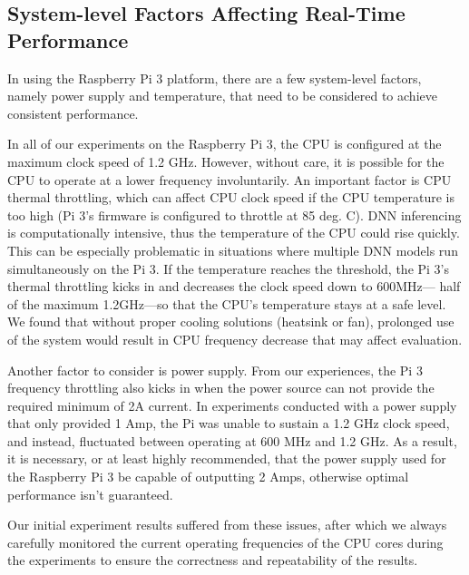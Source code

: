 
\subsection{System-level Factors Affecting Real-Time Performance}
In using the Raspberry Pi 3 platform, there are a
few system-level factors, namely power supply and temperature, that
need to be considered to achieve consistent performance. 

In all of our experiments on the Raspberry Pi 3, the CPU  is configured
at the maximum clock speed of 1.2 GHz. However, without care, it is
possible for the CPU to operate at a lower frequency involuntarily. 
An important factor is CPU thermal throttling, which can affect CPU
clock speed if the CPU temperature is too high (Pi 3's firmware is
configured to throttle at 85 deg. C).
DNN inferencing is computationally intensive, thus the temperature of
the CPU could rise quickly. This can be especially problematic in
situations where multiple DNN models run simultaneously on the
Pi 3. If the temperature reaches the threshold, the Pi 3's thermal
throttling kicks in and decreases the clock speed down to 600MHz---
half of the maximum 1.2GHz---so that the CPU's temperature stays at a
safe level.
We found that without proper cooling solutions (heatsink or fan), 
prolonged use of the system would result in CPU frequency decrease
that may affect evaluation.

Another factor to consider is power supply. From our experiences, the
Pi 3 frequency throttling also kicks in when the power source can not
provide the required minimum of 2A current.
In experiments conducted with a power supply that only provided 1 Amp,
the Pi was unable to sustain a 1.2 GHz clock speed, and instead,
fluctuated between operating at 600 MHz and 1.2 GHz. As a result, it
is necessary, or at least highly recommended, that the power supply
used for the Raspberry Pi 3 be capable of outputting 2 Amps, otherwise
optimal performance isn't guaranteed.

Our initial experiment results suffered from these issues, after which
we always carefully monitored the current operating frequencies of the
CPU cores during the experiments to ensure the correctness and
repeatability of the results.
